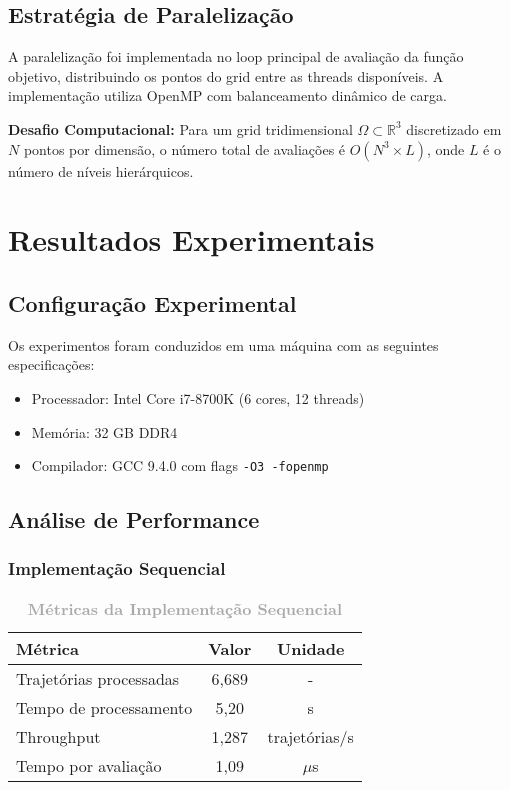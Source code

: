 \documentclass[12pt,a4paper]{article}
\begin{document}
\subsection{Estratégia de Paralelização}

\begin{destacadoverde}
A paralelização foi implementada no loop principal de avaliação da função objetivo, distribuindo os pontos do grid entre as threads disponíveis. A implementação utiliza OpenMP com balanceamento dinâmico de carga.
\end{destacadoverde}

\begin{destacadovermelho}
\textbf{Desafio Computacional:} Para um grid tridimensional $\Omega \subset \mathbb{R}^3$ discretizado em $N$ pontos por dimensão, o número total de avaliações é $O(N^3 \times L)$, onde $L$ é o número de níveis hierárquicos.
\end{destacadovermelho}

\section{Resultados Experimentais}

\subsection{Configuração Experimental}

Os experimentos foram conduzidos em uma máquina com as seguintes especificações:
\begin{itemize}
    \item Processador: Intel Core i7-8700K (6 cores, 12 threads)
    \item Memória: 32 GB DDR4
    \item Compilador: GCC 9.4.0 com flags \texttt{-O3 -fopenmp}
\end{itemize}

\subsection{Análise de Performance}

\subsubsection{Implementação Sequencial}

\begin{table}[H]
\centering
\caption{\textcolor{darkgray}{\textbf{Métricas da Implementação Sequencial}}}
\begin{tabular}{@{}lcc@{}}
\toprule
\textbf{Métrica} & \textbf{Valor} & \textbf{Unidade} \\
\midrule
Trajetórias processadas & 6{,}689 & - \\
Tempo de processamento & 5{,}20 & s \\
Throughput & 1{,}287 & trajetórias/s \\
Tempo por avaliação & 1{,}09 & $\mu$s \\
\bottomrule
\end{tabular}
\end{table}
\end{document}
